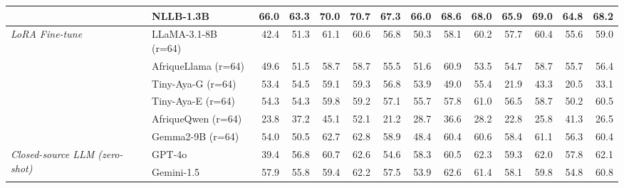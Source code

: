 \begin{table}[t!]
\begin{tabular}{llrrrrrrrrrrrr}
 & NLLB-1.3B & \textbf{66.0} & \textbf{63.3} & \textbf{70.0} & 70.7 & \textbf{67.3} & \textbf{66.0} & \textbf{68.6} & \textbf{68.0} & \textbf{65.9} & \textbf{69.0} & \textbf{64.8} & \textbf{68.2} \\
\midrule
\multirow{6}{*}{\textit{LoRA Fine-tune}} & LLaMA-3.1-8B (r=64) & 42.4 & 51.3 & 61.1 & 60.6 & 56.8 & 50.3 & 58.1 & 60.2 & 57.7 & 60.4 & 55.6 & 59.0 \\
 & AfriqueLlama (r=64) & 49.6 & 51.5 & 58.7 & 58.7 & 55.5 & 51.6 & 60.9 & 53.5 & 54.7 & 58.7 & 55.7 & 56.4 \\
 & Tiny-Aya-G (r=64) & 53.4 & 54.5 & 59.1 & 59.3 & 56.8 & 53.9 & 49.0 & 55.4 & 21.9 & 43.3 & 20.5 & 33.1 \\
 & Tiny-Aya-E (r=64) & 54.3 & 54.3 & 59.8 & 59.2 & 57.1 & 55.7 & 57.8 & 61.0 & 56.5 & 58.7 & 50.2 & 60.5 \\
 & AfriqueQwen (r=64) & 23.8 & 37.2 & 45.1 & 52.1 & 21.2 & 28.7 & 36.6 & 28.2 & 22.8 & 25.8 & 41.3 & 26.5 \\
 & Gemma2-9B (r=64) & 54.0 & 50.5 & 62.7 & 62.8 & 58.9 & 48.4 & 60.4 & 60.6 & 58.4 & 61.1 & 56.3 & 60.4 \\
\midrule
\multirow{2}{*}{\textit{Closed-source LLM (zero-shot)}} & GPT-4o & 39.4 & 56.8 & 60.7 & 62.6 & 54.6 & 58.3 & 60.5 & 62.3 & 59.3 & 62.0 & 57.8 & 62.1 \\
 & Gemini-1.5 & 57.9 & 55.8 & 59.4 & 62.2 & 57.5 & 53.9 & 62.6 & 61.4 & 58.1 & 59.8 & 54.8 & 60.8 \\
\bottomrule
\end{tabular}
\end{table}